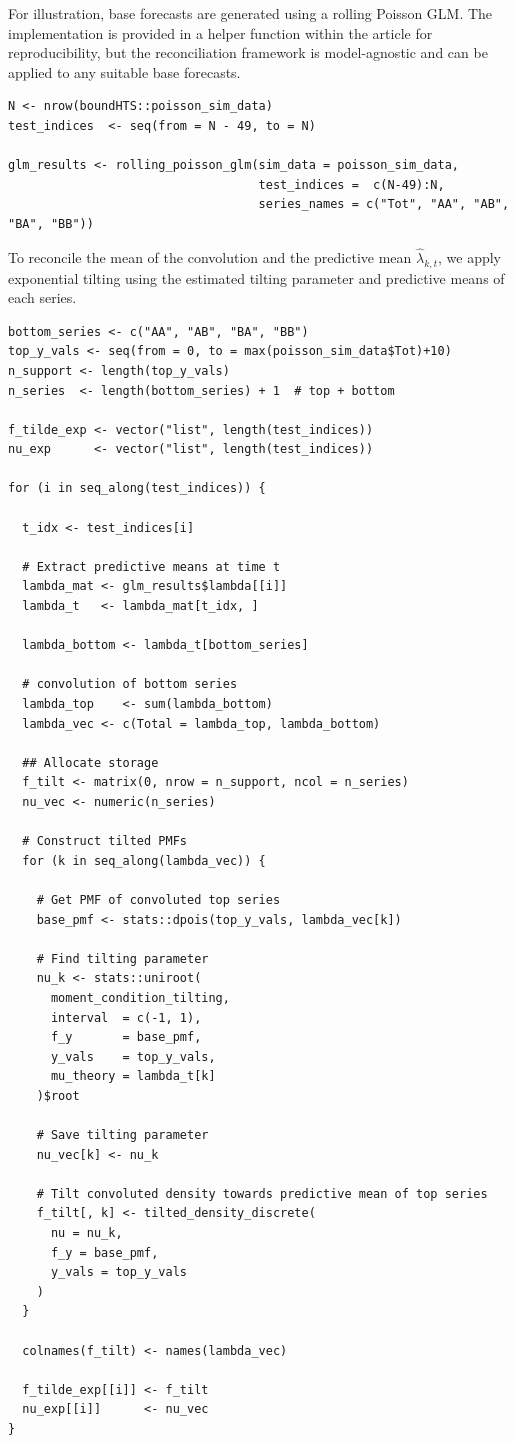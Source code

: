 For illustration, base forecasts are generated using a rolling Poisson GLM. The implementation is provided in a helper function within the article for reproducibility, but the reconciliation framework is model-agnostic and can be applied to any suitable base forecasts.

\begin{verbatim}
N <- nrow(boundHTS::poisson_sim_data) 
test_indices  <- seq(from = N - 49, to = N)

glm_results <- rolling_poisson_glm(sim_data = poisson_sim_data,
                                   test_indices =  c(N-49):N,
                                   series_names = c("Tot", "AA", "AB", "BA", "BB"))
\end{verbatim}

To reconcile the mean of the convolution and the predictive mean \(\hat{\lambda}_{k,t}\), we apply exponential tilting using the estimated tilting parameter and predictive means of each series.

\begin{verbatim}
bottom_series <- c("AA", "AB", "BA", "BB")
top_y_vals <- seq(from = 0, to = max(poisson_sim_data$Tot)+10)
n_support <- length(top_y_vals)
n_series  <- length(bottom_series) + 1  # top + bottom

f_tilde_exp <- vector("list", length(test_indices))
nu_exp      <- vector("list", length(test_indices))

for (i in seq_along(test_indices)) {

  t_idx <- test_indices[i]

  # Extract predictive means at time t
  lambda_mat <- glm_results$lambda[[i]]
  lambda_t   <- lambda_mat[t_idx, ]

  lambda_bottom <- lambda_t[bottom_series]
  
  # convolution of bottom series
  lambda_top    <- sum(lambda_bottom) 
  lambda_vec <- c(Total = lambda_top, lambda_bottom)

  ## Allocate storage
  f_tilt <- matrix(0, nrow = n_support, ncol = n_series)
  nu_vec <- numeric(n_series)

  # Construct tilted PMFs
  for (k in seq_along(lambda_vec)) {
    
    # Get PMF of convoluted top series
    base_pmf <- stats::dpois(top_y_vals, lambda_vec[k])
    
    # Find tilting parameter
    nu_k <- stats::uniroot(
      moment_condition_tilting,
      interval  = c(-1, 1),
      f_y       = base_pmf,
      y_vals    = top_y_vals,
      mu_theory = lambda_t[k]
    )$root
    
    # Save tilting parameter
    nu_vec[k] <- nu_k
        
    # Tilt convoluted density towards predictive mean of top series
    f_tilt[, k] <- tilted_density_discrete(
      nu = nu_k,
      f_y = base_pmf,
      y_vals = top_y_vals
    )
  }

  colnames(f_tilt) <- names(lambda_vec)

  f_tilde_exp[[i]] <- f_tilt
  nu_exp[[i]]      <- nu_vec
}
\end{verbatim}

